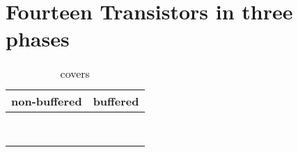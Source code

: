 \section{Fourteen Transistors in three phases}

\begin{table}[ht]
\centering
\caption*{covers}

\begin{tabular}{cc}
    \toprule
    non-buffered & buffered \\
    \midrule

    \nameref{cell:AOOAI223} & \nameref{cell:AOOA233} \\
    \nameref{cell:OAAOI223} & \nameref{cell:OAAO233} \\
    \nameref{cell:AAOOAI223} & \nameref{cell:AAOOA223} \\
    \nameref{cell:OOAAOI223} & \nameref{cell:OOAAO223} \\
    \nameref{cell:AAOOAI2212} & \nameref{cell:AAOOA2211} \\
    \nameref{cell:OOAAOI2212} & \nameref{cell:OOAAO2211} \\
    \nameref{cell:AAAOAI2221} & \nameref{cell:AAAOA2221} \\
    \nameref{cell:OOOAOI2221} & \nameref{cell:OOOAO2221}

\end{tabular}

\end{table}

